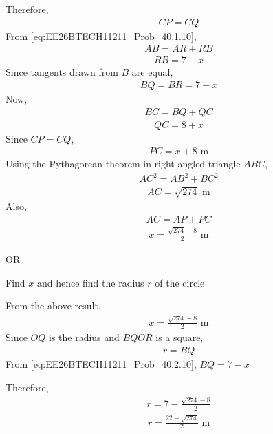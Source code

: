 \begin{enumerate}[label=\thesubsection.\arabic*, ref=\thesubsection.\theenumi]
Therefore,
\begin{align}
CP=CQ
\end{align}
From \eqref{eq:EE26BTECH11211_Prob_40.1.10},
\begin{align}
AB=AR+RB
\end{align}
\begin{align}
RB=7-x
\end{align}
Since tangents drawn from \(B\) are equal,
\begin{align}
BQ=BR=7-x  \label{eq:EE26BTECH11211_Prob_40.2.10}
\end{align}
Now,
\begin{align}
BC=BQ+QC
\end{align}
\begin{align}
QC=8+x
\end{align}
Since \(CP=CQ\),
\begin{align}
PC=x+8\text{ m}
\end{align}
Using the Pythagorean theorem in right-angled triangle \(ABC\),
\begin{align}
AC^2=AB^2+BC^2
\end{align}
\begin{align}
AC=\sqrt{274}\text{ m}
\end{align}
Also,
\begin{align}
AC=AP+PC
\end{align}
\begin{align}
x=\frac{\sqrt{274}-8}{2}\text{ m}
\end{align}

OR

  Find \(x\) and hence find the radius \(r\) of the circle

From the above result,
\begin{align}
x=\frac{\sqrt{274}-8}{2}\text{ m}
\end{align}
Since \(OQ\) is the radius and \(BQOR\) is a square,
\begin{align}
r=BQ
\end{align}
From \eqref{eq:EE26BTECH11211_Prob_40.2.10},
$BQ=7-x$

Therefore,
\begin{align}
r=7-\frac{\sqrt{274}-8}{2}
\end{align}
\begin{align}
r=\frac{22-\sqrt{274}}{2}\text{ m}
\end{align}

\end{enumerate}